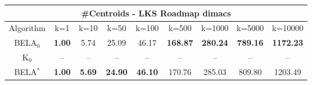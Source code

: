 \begin{tabular}{c|cccccccc}\toprule
\multicolumn{9}{c}{#Centroids - LKS Roadmap dimacs}\\ \midrule
Algorithm & k=1 & k=10 & k=50 & k=100 & k=500 & k=1000 & k=5000 & k=10000 \\ \midrule
BELA$_0$ & \textbf{1.00} & 5.74 & 25.09 & 46.17 & \textbf{168.87} & \textbf{280.24} & \textbf{789.16} & \textbf{1172.23} \\
K$_0$ & -- & -- & -- & -- & -- & -- & -- & -- \\
BELA$^*$ & \textbf{1.00} & \textbf{5.69} & \textbf{24.90} & \textbf{46.10} & 170.76 & 285.03 & 809.80 & 1203.49 \\ \bottomrule 
\end{tabular}
